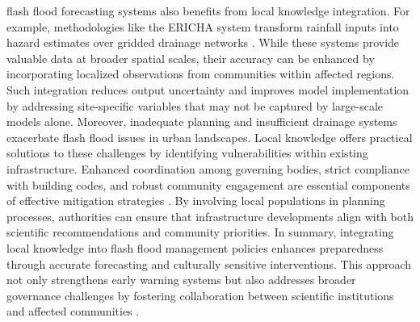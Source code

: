 flash flood forecasting systems also benefits from local knowledge integration. For example, methodologies like the ERICHA system transform rainfall inputs into hazard estimates over gridded drainage networks \citep{Ritter2021a}\citep{Ritter2021b}. While these systems provide valuable data at broader spatial scales, their accuracy can be enhanced by incorporating localized observations from communities within affected regions. Such integration reduces output uncertainty and improves model implementation by addressing site-specific variables that may not be captured by large-scale models alone. Moreover, inadequate planning and insufficient drainage systems exacerbate flash flood issues in urban landscapes. Local knowledge offers practical solutions to these challenges by identifying vulnerabilities within existing infrastructure. Enhanced coordination among governing bodies, strict compliance with building codes, and robust community engagement are essential components of effective mitigation strategies \citep{Saad2024}. By involving local populations in planning processes, authorities can ensure that infrastructure developments align with both scientific recommendations and community priorities. In summary, integrating local knowledge into flash flood management policies enhances preparedness through accurate forecasting and culturally sensitive interventions. This approach not only strengthens early warning systems but also addresses broader governance challenges by fostering collaboration between scientific institutions and affected communities \citep{Msigwa2024}\citep{Saad2024}\citep{Bodoque2019}\citep{Wang2023}.
